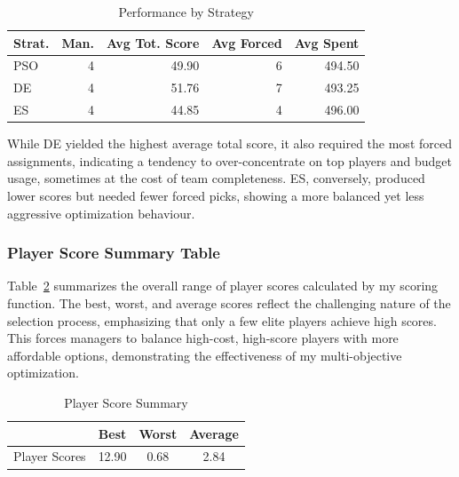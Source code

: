 \documentclass[sigconf]{acmart}
\begin{document}
	\begin{table}[H]
		\centering
		\caption{Performance by Strategy}
		\label{tab:performance_by_strategy}
		\begin{tabular}{lrrrr}
			\toprule
			\textbf{Strat.} & \textbf{Man.} & \textbf{Avg Tot. Score} & \textbf{Avg Forced} & \textbf{Avg Spent} \\
			\midrule
			PSO & 4 & 49.90 & 6 & 494.50 \\
			DE  & 4 & 51.76 & 7 & 493.25 \\
			ES  & 4 & 44.85 & 4 & 496.00 \\
			\bottomrule
		\end{tabular}
	\end{table}
	
	While DE yielded the highest average total score, it also required the most forced assignments, indicating a tendency to over-concentrate on top players and budget usage, sometimes at the cost of team completeness. ES, conversely, produced lower scores but needed fewer forced picks, showing a more balanced yet less aggressive optimization behaviour.
	
	\subsubsection{Player Score Summary Table}
	Table~\ref{tab:player_summary} summarizes the overall range of player scores calculated by my scoring function. The best, worst, and average scores reflect the challenging nature of the selection process, emphasizing that only a few elite players achieve high scores. This forces managers to balance high-cost, high-score players with more affordable options, demonstrating the effectiveness of my multi-objective optimization.
	
	\begin{table}[H]
		\centering
		\caption{Player Score Summary}
		\label{tab:player_summary}
		\begin{tabular}{lccc}
			\toprule
			& \textbf{Best} & \textbf{Worst} & \textbf{Average} \\
			\midrule
			Player Scores & 12.90 & 0.68 & 2.84 \\
			\bottomrule
		\end{tabular}
	\end{table}
	
\end{document}
